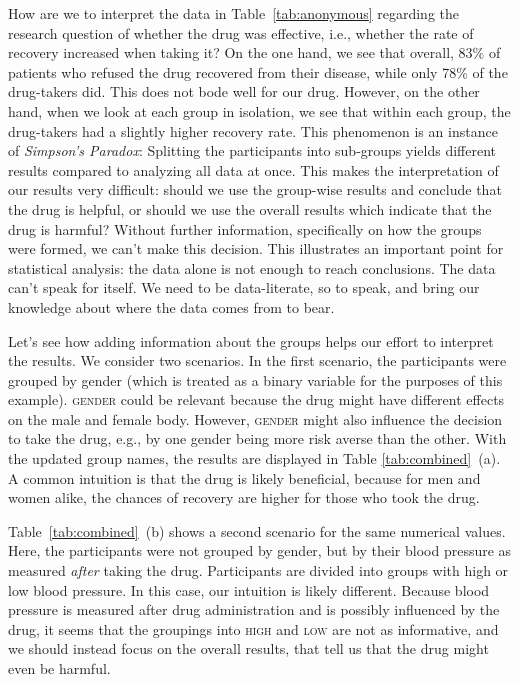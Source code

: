\documentclass[nobib]{tufte-handout}
\begin{document}
How are we to interpret the data in Table~\ref{tab:anonymous} regarding the research question of whether the drug was effective, i.e., whether the rate of recovery increased when taking it?
On the one hand, we see that overall, 83\% of patients who refused the drug recovered from their disease, while only 78\% of the drug-takers did.
This does not bode well for our drug.
However, on the other hand, when we look at each group in isolation, we see that within each group, the drug-takers had a slightly higher recovery rate.
This phenomenon is an instance of \textit{Simpson's Paradox}: Splitting the participants into sub-groups yields different results compared to analyzing all data at once.
This makes the interpretation of our results very difficult: should we use the group-wise results and conclude that the drug is helpful, or should we use the overall results which indicate that the drug is harmful? 
Without further information, specifically on how the groups were formed, we can't make this decision.
This illustrates an important point for statistical analysis: the data alone is not enough to reach conclusions.
The data can't speak for itself. 
We need to be data-literate, so to speak, and bring our knowledge about where the data comes from to bear.

Let's see how adding information about the groups helps our effort to interpret the results. 
We consider two scenarios.
In the first scenario, the participants were grouped by gender (which is treated as a binary variable for the purposes of this example).
\textsc{gender} could be relevant because the drug might have different effects on the male and female body. 
However, \textsc{gender} might also influence the decision to take the drug, e.g., by one gender being more risk averse than the other. 
With the updated group names, the results are displayed in Table \ref{tab:combined}~(a).
A common intuition is that the drug is likely beneficial, because for men and women alike, the chances of recovery are higher for those who took the drug.


Table~\ref{tab:combined}~(b) shows a second scenario for the same numerical values.
Here, the participants were not grouped by gender, but by their blood pressure as measured \textit{after} taking the drug.
Participants are divided into groups with high or low blood pressure. 
In this case, our intuition is likely different. 
Because blood pressure is measured after drug administration and is possibly influenced by the drug, it seems that the groupings into \textsc{high} and \textsc{low} are not as informative, and we should instead focus on the overall results, that tell us that the drug might even be harmful.
\end{document}
